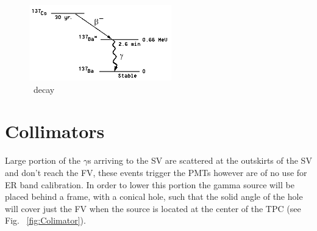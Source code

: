 \begin{figure}
	\begin{center}
	\includegraphics[width=0.55\textwidth, height= 0.3\textheight]{figs/Cs137.png}%
		\caption{\label{fig:Cs} \Cs\ decay}
		\end{center}
	
	\end{figure} 

\section{Collimators} \label{sec:Col}
 
Large portion of the $\gamma$s arriving to the SV are scattered at the outskirts of the SV and don't reach the FV, these events trigger the PMTs however are of no use for ER band calibration. In order to lower this portion the gamma source will be placed behind a frame, with a conical hole, such that the solid angle of the hole will cover just the FV when the source is located at the center of the TPC (see Fig. ~\ref{fig:Colimator}). 
%

